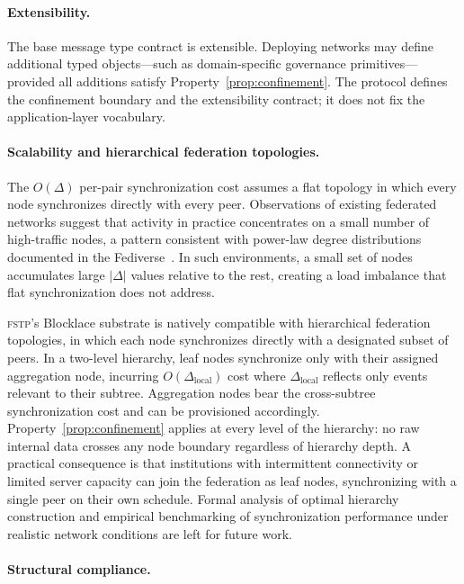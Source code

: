 \documentclass[12pt]{article}
\newcommand{\FSTP}{\textsc{fstp}}
\begin{document}
	\paragraph{Extensibility.}
	
	The base message type contract is extensible. Deploying networks may
	define additional typed objects---such as domain-specific governance
	primitives---provided all additions satisfy
	Property~\ref{prop:confinement}. The protocol defines the confinement
	boundary and the extensibility contract; it does not fix the
	application-layer vocabulary.
	
	\paragraph{Scalability and hierarchical federation topologies.}
	
	The $O(\Delta)$ per-pair synchronization cost assumes a flat topology
	in which every node synchronizes directly with every peer.
	Observations of existing federated networks suggest that activity in
	practice concentrates on a small number of high-traffic nodes, a
	pattern consistent with power-law degree distributions documented in
	the Fediverse~\cite{la2021understanding}. In such environments, a
	small set of nodes accumulates large $|\Delta|$ values relative to the
	rest, creating a load imbalance that flat synchronization does not
	address.
	
	\FSTP{}'s Blocklace substrate is natively compatible with hierarchical
	federation topologies, in which each node synchronizes directly with a
	designated subset of peers. In a two-level hierarchy, leaf nodes
	synchronize only with their assigned aggregation node, incurring
	$O(\Delta_{\text{local}})$ cost where $\Delta_{\text{local}}$ reflects
	only events relevant to their subtree. Aggregation nodes bear the
	cross-subtree synchronization cost and can be provisioned accordingly.
	Property~\ref{prop:confinement} applies at every level of the
	hierarchy: no raw internal data crosses any node boundary regardless
	of hierarchy depth. A practical consequence is that institutions with
	intermittent connectivity or limited server capacity can join the
	federation as leaf nodes, synchronizing with a single peer on their
	own schedule. Formal analysis of optimal hierarchy construction and
	empirical benchmarking of synchronization performance under realistic
	network conditions are left for future work.
	
	\paragraph{Structural compliance.}
	
\end{document}
